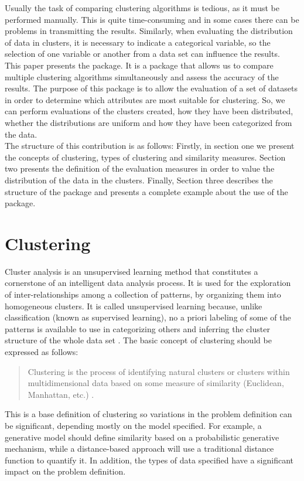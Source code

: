 Usually the task of comparing clustering algorithms is tedious, as it must be performed manually. This is quite time-consuming and in some cases there can be problems in transmitting the results. Similarly, when evaluating the distribution of data in clusters, it is necessary to indicate a categorical variable, so the selection of one variable or another from a data set can influence the results.\\
This paper presents the  package. It is a package that allows us to compare multiple clustering algorithms simultaneously and assess the accuracy of the results. The purpose of this package is to allow the evaluation of a set of datasets in order to determine which attributes are most suitable for clustering. So, we can perform evaluations of the clusters created, how they have been distributed, whether the distributions are uniform and how they have been categorized from the data.\\
The structure of this contribution is as follows: Firstly, in section one  we present the concepts of clustering, types of clustering and similarity measures. Section two  presents the definition of the evaluation measures in order to value the distribution of the data in the clusters. Finally, Section three  describes the structure of the package and presents a complete example about the use of the package.

\section{Clustering} \label{sec:seccion1}

Cluster analysis is an unsupervised learning method that constitutes a cornerstone of an intelligent data analysis process. It is used for the exploration of inter-relationships among a collection of patterns, by organizing them into homogeneous clusters. It is called unsupervised learning because, unlike classification (known as supervised learning), no a priori labeling of some of the patterns is available to use in categorizing others and inferring the cluster structure of the whole data set \citep{b17}. The basic concept of clustering should be expressed as follows:
\\
\begin{quote}
Clustering is the process of identifying natural clusters or clusters within multidimensional data based on some measure of similarity (Euclidean, Manhattan, etc.) \citep{b18}.
\end{quote}
This is a base definition of clustering so variations in the problem definition can be significant, depending mostly on the model specified. For example, a generative model should define similarity based on a probabilistic generative mechanism, while a distance-based approach will use a traditional distance function to quantify it. In addition, the types of data specified have a significant impact on the problem definition.

